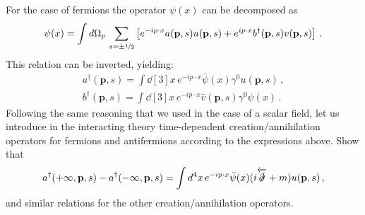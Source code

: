 \documentclass{tutorial}
\begin{document}
\begin{enumerate}
    For the case of fermions the operator $\psi(x)$ can be decomposed
    as
    \[
    \psi(x) = \int d\Omega_p\, \sum_{s=\pm\nicefrac{1}{2}} \left[
      e^{-i p\cdot x} a(\mathbf{p},s) u(\mathbf{p},s) + 
      e^{i p\cdot x} b^\dagger(\mathbf{p},s) v(\mathbf{p},s)
      \right]\, .
    \]
    This relation can be inverted, yielding:
    \begin{align}
      a^\dagger(\mathbf{p},s) = \int \dd[3]{x}\, e^{-ip\cdot x}
      \bar{\psi}(x) \gamma^0 u(\mathbf{p},s) \, , \nonumber \\
      b^\dagger(\mathbf{p},s) = \int \dd[3]{x}\, e^{-ip\cdot x}
      \bar{v}(\mathbf{p},s) \gamma^0 \psi(x) \, . \nonumber 
    \end{align}
    Following the same reasoning that we used in the case of a scalar
    field, let us introduce in the interacting theory time-dependent
    creation/annihilation operators for fermions and antifermions
    according to the expressions above. 
    Show that
    \begin{align}
      \label{eq:3}
      a^\dagger(+\infty,\mathbf{p},s) - 
      a^\dagger(-\infty,\mathbf{p},s) = 
      \int d^4x\,
      e^{-ip\cdot x} \bar\psi(x)
      (i\overleftarrow{\slashed{\partial}}+m) u(\mathbf{p},s)\, ,
    \end{align}
    and similar relations for the other creation/annihilation
    operators. 
 

\end{enumerate}
\end{document}
